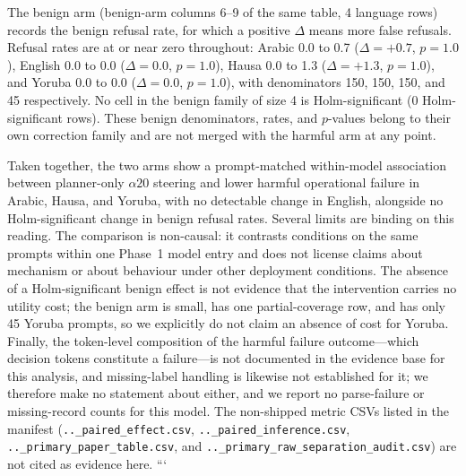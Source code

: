 The benign arm (benign-arm columns 6--9 of the same table, 4 language rows)
records the benign refusal rate, for which a positive $\Delta$ means more false
refusals. Refusal rates are at or near zero throughout: Arabic 0.0 to 0.7
($\Delta = +0.7$, $p = 1.0$), English 0.0 to 0.0 ($\Delta = 0.0$, $p = 1.0$),
Hausa 0.0 to 1.3 ($\Delta = +1.3$, $p = 1.0$), and Yoruba 0.0 to 0.0
($\Delta = 0.0$, $p = 1.0$), with denominators 150, 150, 150, and 45
respectively. No cell in the benign family of size 4 is Holm-significant
(0 Holm-significant rows). These benign denominators, rates, and $p$-values
belong to their own correction family and are not merged with the harmful arm at
any point.

Taken together, the two arms show a prompt-matched within-model association
between planner-only $\alpha20$ steering and lower harmful operational failure
in Arabic, Hausa, and Yoruba, with no detectable change in English, alongside no
Holm-significant change in benign refusal rates. Several limits are binding on
this reading. The comparison is non-causal: it contrasts conditions on the same
prompts within one Phase~1 model entry and does not license claims about
mechanism or about behaviour under other deployment conditions. The absence of a
Holm-significant benign effect is not evidence that the intervention carries no
utility cost; the benign arm is small, has one partial-coverage row, and has only
45 Yoruba prompts, so we explicitly do not claim an absence of cost for Yoruba.
Finally, the token-level composition of the harmful failure outcome---which
decision tokens constitute a failure---is not documented in the evidence base
for this analysis, and missing-label handling is likewise not established for it;
we therefore make no statement about either, and we report no parse-failure or
missing-record counts for this model. The non-shipped metric CSVs listed in the
manifest (\texttt{..\_paired\_effect.csv}, \texttt{..\_paired\_inference.csv},
\texttt{..\_primary\_paper\_table.csv}, and
\texttt{..\_primary\_raw\_separation\_audit.csv}) are not cited as evidence here.
```

